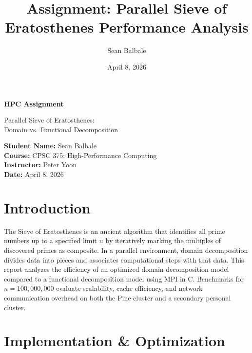 \documentclass[11pt]{article}
\title{\textbf{Assignment: Parallel Sieve of Eratosthenes Performance Analysis}}
\author{Sean Balbale}
\date{April 8, 2026}
\begin{document}
\begin{titlepage}
  \begin{center}
    \vspace*{1in}

    \Huge
    \textbf{HPC Assignment}

    \LARGE
    Parallel Sieve of Eratosthenes: \\ Domain vs. Functional Decomposition

    \vspace{3in}

    \textbf{Student Name:} Sean Balbale
    \\ \textbf{Course:} CPSC 375: High-Performance Computing
    \\ \textbf{Instructor:} Peter Yoon
    \\ \textbf{Date:} April 8, 2026

    \vfill

  \end{center}
\end{titlepage}

\newpage

\section{Introduction}
The Sieve of Eratosthenes is an ancient algorithm that identifies all prime numbers up to a specified limit $n$ by iteratively marking the multiples of discovered primes as composite. In a parallel environment, domain decomposition divides data into pieces and associates computational steps with that data. This report analyzes the efficiency of an optimized domain decomposition model compared to a functional decomposition model using MPI in C. Benchmarks for $n=100,000,000$ evaluate scalability, cache efficiency, and network communication overhead on both the Pine cluster and a secondary personal cluster.

\section{Implementation \& Optimization}
\end{document}
